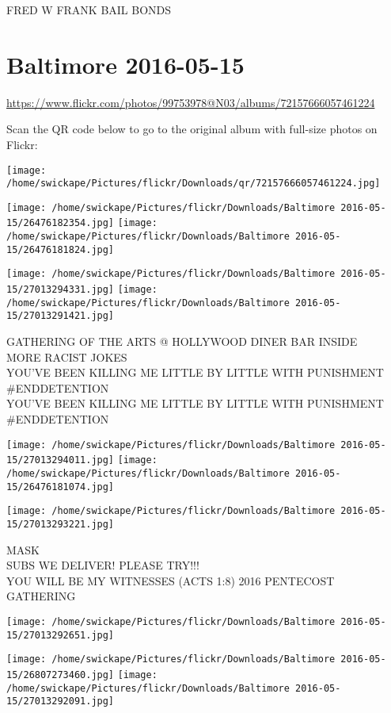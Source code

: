 \documentclass[10pt,letterpaper]{article}
\begin{document}
FRED W FRANK BAIL BONDS
\pagebreak

\section*{Baltimore 2016-05-15}

\url{https://www.flickr.com/photos/99753978@N03/albums/72157666057461224}

Scan the QR code below to go to the original album with full-size photos on Flickr:

\texttt{[image: /home/swickape/Pictures/flickr/Downloads/qr/72157666057461224.jpg]}
\pagebreak

\texttt{[image: /home/swickape/Pictures/flickr/Downloads/Baltimore 2016-05-15/26476182354.jpg]}
\texttt{[image: /home/swickape/Pictures/flickr/Downloads/Baltimore 2016-05-15/26476181824.jpg]}

\texttt{[image: /home/swickape/Pictures/flickr/Downloads/Baltimore 2016-05-15/27013294331.jpg]}
\texttt{[image: /home/swickape/Pictures/flickr/Downloads/Baltimore 2016-05-15/27013291421.jpg]}

GATHERING OF THE ARTS @ HOLLYWOOD DINER BAR INSIDE\\
MORE RACIST JOKES\\
YOU'VE BEEN KILLING ME LITTLE BY LITTLE WITH PUNISHMENT \#ENDDETENTION\\
YOU'VE BEEN KILLING ME LITTLE BY LITTLE WITH PUNISHMENT \#ENDDETENTION
\pagebreak

\texttt{[image: /home/swickape/Pictures/flickr/Downloads/Baltimore 2016-05-15/27013294011.jpg]}
\texttt{[image: /home/swickape/Pictures/flickr/Downloads/Baltimore 2016-05-15/26476181074.jpg]}

\texttt{[image: /home/swickape/Pictures/flickr/Downloads/Baltimore 2016-05-15/27013293221.jpg]}

MASK\\
SUBS WE DELIVER!  PLEASE TRY!!!\\
YOU WILL BE MY WITNESSES (ACTS 1:8) 2016 PENTECOST GATHERING
\pagebreak

\texttt{[image: /home/swickape/Pictures/flickr/Downloads/Baltimore 2016-05-15/27013292651.jpg]}

\vspace{0.25in}
\texttt{[image: /home/swickape/Pictures/flickr/Downloads/Baltimore 2016-05-15/26807273460.jpg]}
\texttt{[image: /home/swickape/Pictures/flickr/Downloads/Baltimore 2016-05-15/27013292091.jpg]}
\end{document}

